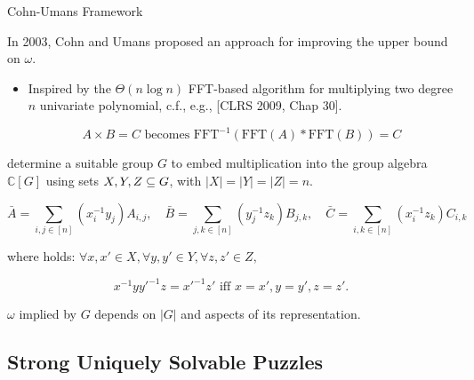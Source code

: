\documentclass[t,10pt,
mathserif,xcolor=dvipsnames]{beamer}
\begin{document}
\newcommand\FFT{\mathrm{FFT}}
\newcommand\CC{\mathbb{C}}

\begin{myframe}{Cohn-Umans Framework}

  In 2003, Cohn and Umans proposed an approach for improving the upper
  bound on $\omega$.

  \begin{itemize}
  \item Inspired by the $\Theta(n \log n)$ FFT-based algorithm for
    multiplying two degree $n$ univariate polynomial, c.f., e.g.,
    [CLRS 2009, Chap 30].

    $$ A \times B = C\text{ becomes }  \FFT^{-1}(\FFT(A) * \FFT(B)) = C$$

  \end{itemize}

  \pause
  
   determine a suitable group $G$ to embed
  multiplication into the group algebra $\CC[G]$ using sets $X, Y, Z
  \subseteq G$, with $|X| = |Y| = |Z| = n$.

  $$\bar{A} = \sum_{i, j \in [n]} (x_i^{-1} y_j) A_{i,j}, \quad \bar{B} =
  \sum_{j, k \in [n]} (y_j^{-1} z_k) B_{j,k}, \quad \bar{C} = \sum_{i, k \in
    [n]} (x_i^{-1} z_k) C_{i,k}$$

  where  holds: $\forall x,x'
  \in X, \forall y,y' \in Y, \forall z,z' \in Z,$

  $$x^{-1} y y'^{-1} z = x'^{-1} z' \text{ iff } x = x', y = y', z =
  z'.$$
  
  $\omega$ implied by $G$ depends on $|G|$ and aspects of its
  representation.
  
\end{myframe}



\subsection{Strong Uniquely Solvable Puzzles}
\end{document}
